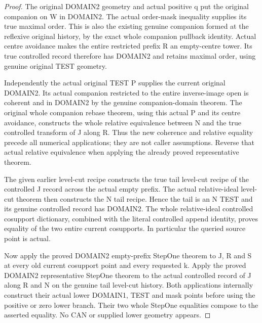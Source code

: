 \begin{proof}
The original DOMAIN2 geometry and actual positive q put the original
companion on W in DOMAIN2. The actual order-mask inequality supplies its
true maximal order. This is also the existing genuine companion formed
at the reflexive original history, by the exact whole companion pullback
identity. Actual centre avoidance makes the entire restricted prefix R
an empty-centre tower. Its true controlled record therefore has DOMAIN2
and retains maximal order, using genuine original TEST geometry.

Independently the actual original TEST P supplies the current original
DOMAIN2. Its actual companion restricted to the entire inverse-image
open is coherent and in DOMAIN2 by the genuine companion-domain theorem.
The original whole companion rebase theorem, using this actual P and its
centre avoidance, constructs the whole relative equivalence between N
and the true controlled transform of J along R. Thus the new coherence
and relative equality precede all numerical applications; they are not
caller assumptions. Reverse that actual relative equivalence when
applying the already proved representative theorem.

The given earlier level-cut recipe constructs the true tail level-cut
recipe of the controlled J record across the actual empty prefix. The
actual relative-ideal level-cut theorem then constructs the N tail recipe.
Hence the tail is an N TEST and its genuine controlled record has DOMAIN2.
The whole relative-ideal controlled cosupport dictionary, combined with
the literal controlled append identity, proves equality of the two entire
current cosupports. In particular the queried source point is actual.

Now apply the proved DOMAIN2 empty-prefix StepOne theorem to J, R and S
at every old current cosupport point and every requested k. Apply the
proved DOMAIN2 representative StepOne theorem to the actual controlled
record of J along R and N on the genuine tail level-cut history. Both
applications internally construct their actual lower DOMAIN1, TEST and
mask points before using the positive or zero lower branch. Their two
whole StepOne equalities compose to the asserted equality. No CAN or
supplied lower geometry appears.
\end{proof}

